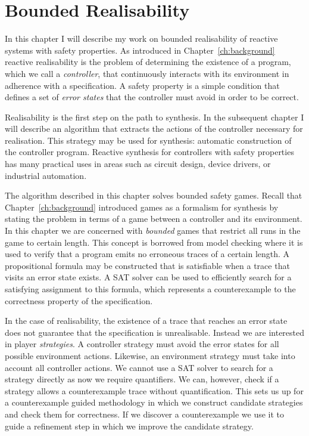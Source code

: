 \chapter{Bounded Realisability}
\label{ch:bounded}

\newtheorem*{exmp}{Example}
\newtheorem*{exmpI}{Example: Intuition behind the algorithm}

In this chapter I will describe my work on bounded realisability of reactive systems with safety properties. As introduced in Chapter~\ref{ch:background} reactive realisability is the problem of determining the existence of a program, which we call a \emph{controller}, that continuously interacts with its environment in adherence with a specification. A safety property is a simple condition that defines a set of \emph{error states} that the controller must avoid in order to be correct.

Realisability is the first step on the path to synthesis. In the subsequent chapter I will describe an algorithm that extracts the actions of the controller necessary for realisation. This strategy may be used for synthesis: automatic construction of the controller program. Reactive synthesis for controllers with safety properties has many practical uses in areas such as circuit design, device drivers, or industrial automation.

The algorithm described in this chapter solves bounded safety games. Recall that Chapter~\ref{ch:background} introduced games as a formalism for synthesis by stating the problem in terms of a game between a controller and its environment. In this chapter we are concerned with \emph{bounded} games that restrict all runs in the game to certain length. This concept is borrowed from model checking where it is used to verify that a program emits no erroneous traces of a certain length. A propositional formula may be constructed that is satisfiable when a trace that visits an error state exists. A SAT solver can be used to efficiently search for a satisfying assignment to this formula, which represents a counterexample to the correctness property of the specification. 

In the case of realisability, the existence of a trace that reaches an error state does not guarantee that the specification is unrealisable.  Instead we are interested in player \emph{strategies}. A controller strategy must avoid the error states for all possible environment actions. Likewise, an environment strategy must take into account all controller actions. We cannot use a SAT solver to search for a strategy directly as now we require quantifiers. We can, however, check if a strategy allows a counterexample trace without quantification. This sets us up for a counterexample guided methodology in which we construct candidate strategies and check them for correctness. If we discover a counterexample we use it to guide a refinement step in which we improve the candidate strategy.

